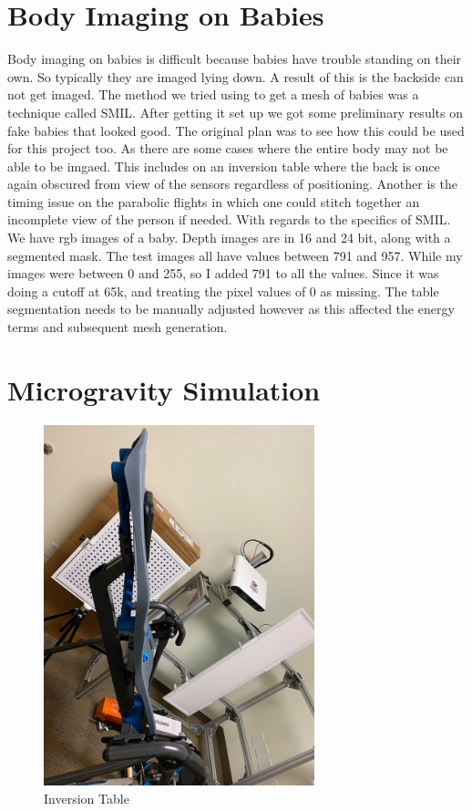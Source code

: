 \section{Body Imaging on Babies}
Body imaging on babies is difficult because babies have trouble standing on their own. So typically they are imaged lying down. A result of this is the backside can not get imaged. The method we tried using to get a mesh of babies was a technique called SMIL\cite{hesse2018learning}. After getting it set up we got some preliminary results on fake babies that looked good. The original plan was to see how this could be used for this project too. As there are some cases where the entire body may not be able to be imgaed. This includes on an inversion table where the back is once again obscured from view of the sensors regardless of positioning. Another is the timing issue on the parabolic flights in which one could stitch together an incomplete view of the person if needed. With regards to the specifics of SMIL. We have rgb images of a baby. Depth images are in 16 and 24 bit, along with a segmented mask. The test images all have values between 791 and 957. While my images were between 0 and 255, so I added 791 to all the values. Since it was doing a cutoff at 65k, and treating the pixel values of 0 as missing. The table segmentation needs to be manually adjusted however as this affected the energy terms and subsequent mesh generation.
\section{Microgravity Simulation}


\begin{figure}[h]
	\caption{Inversion Table}
	\centering
	\includegraphics[width=0.7\textwidth]{images/inversion.jpg}
\end{figure}
